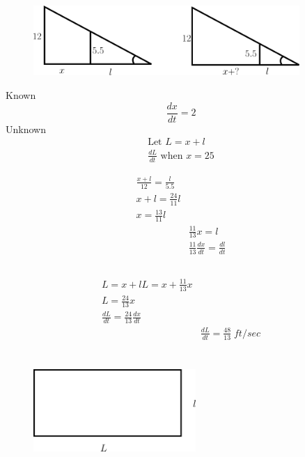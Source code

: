 \documentclass[16pt letter]{article}
\begin{document}
\section{}
\label{q:7}

\begin{figure}[h]
	\centering
	\includegraphics[width=0.90\textwidth]{Application Q7}
\end{figure}

Known \[\frac{dx}{dt} = 2\]
Unknown
\begin{gather*}
	\text{Let } L = x + l\\
	\frac{dL}{dt} \text{ when } x= 25
\end{gather*}

\begin{align*}
	\frac{x+l}{12} = \frac{l}{5.5}                \\
	x+l = \frac{24}{11}l                          \\
	x = \frac{13}{11}l                            \\
	 & \frac{11}{13}x = l                         \\
	 & \frac{11}{13}\frac{dx}{dt} = \frac{dl}{dt}
\end{align*}

\subsection{}

\begin{align*}
	L = x +l
	L = x + \frac{11}{13}x                     \\
	L = \frac{24}{13}x                         \\
	\frac{dL}{dt} = \frac{24}{13}\frac{dx}{dt} \\
	 & \frac{dL}{dt} = \frac{48}{13} \;ft/sec
\end{align*}
\pagebreak

\section{} %
\label{q:8}
\begin{figure}[h]
	\centering
	\includegraphics[width=0.55\textwidth]{Application Q8}
\end{figure}
\end{document}
